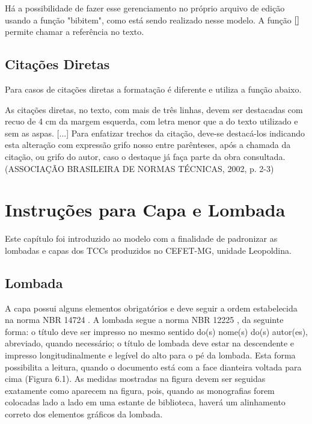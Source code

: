 \documentclass[
        oneside,      %
        english,			
        brazil			 
        ]{configcefetmglpd}
\begin{document}
Há a possibilidade de fazer esse gerenciamento no próprio arquivo de edição usando a função "bibitem", como está sendo realizado nesse modelo. A função $\cite{}$ permite chamar a referência no texto.

\section{Citações Diretas}
Para casos de citações diretas a formatação é diferente e utiliza a função abaixo.

\begin{citacao}
	As cita\c{c}\~oes diretas, no texto, com mais de tr\^es linhas, devem ser destacadas 
	com recuo de 4 cm da margem esquerda, com letra menor que a do texto utilizado 
	e sem as aspas. [...] Para enfatizar trechos da cita\c{c}\~ao, deve-se destac\'a-los indicando esta 
	altera\c{c}\~ao com express\~ao grifo nosso entre par\^enteses, ap\'os a chamada da cita\c{c}\~ao, ou grifo 
	do autor, caso o destaque j\'a fa\c{c}a parte da obra consultada. (ASSOCIA\c{C}\~AO BRASILEIRA DE NORMAS 
	T\'ECNICAS, 2002, p. 2-3)
\end{citacao}


\chapter{Instruções para Capa e Lombada}
Este capítulo foi introduzido ao modelo com a finalidade de padronizar as lombadas e capas dos TCCs produzidos no CEFET-MG, 
unidade Leopoldina.

\section{Lombada}
A capa possui alguns elementos obrigatórios e deve seguir a ordem estabelecida na norma NBR 14724 \cite{bib:abnt14724}. 
A lombada segue a norma NBR 12225 \cite{bib:abnt1225}, da seguinte forma: o título deve ser impresso no mesmo sentido do(s) 
nome(s) do(s) autor(es), abreviado, quando necessário; o título de lombada deve estar na descendente e impresso longitudinalmente 
e legível do alto para o pé da lombada. Esta forma possibilita a leitura, quando o documento está com a face dianteira voltada 
para cima (Figura 6.1). As medidas mostradas na figura devem ser seguidas exatamente como aparecem na figura, pois, quando as 
monografias forem colocadas lado a lado em uma estante de biblioteca, haverá um alinhamento correto dos elementos gráficos da
lombada.
\end{document}
